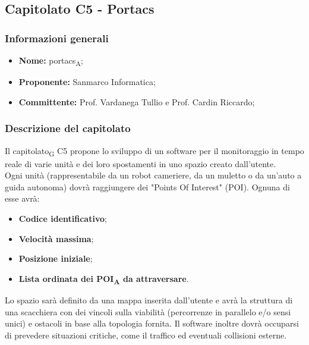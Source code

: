 \subsection{Capitolato C5 - Portacs}
\subsubsection{Informazioni generali}
	\begin{itemize}
	\item \textbf{Nome:} portacs\textsubscript{A};
	\item \textbf{Proponente:} Sanmarco Informatica;
	\item \textbf{Committente:}  Prof. Vardanega Tullio e Prof. Cardin Riccardo;
	\end{itemize}
\subsubsection{Descrizione del capitolato}
Il capitolato\textsubscript{G} C5 propone lo sviluppo di un software per il monitoraggio in tempo reale di varie unità e dei loro spostamenti in uno spazio creato dall'utente. \\
Ogni unità (rappresentabile da un robot cameriere, da un muletto o da un'auto a guida autonoma) dovrà raggiungere dei "Points Of Interest" (POI).
Ognuna di esse avrà: 
\begin{itemize}
	\item \textbf{Codice identificativo};
	\item \textbf{Velocità massima};
	\item \textbf{Posizione iniziale};
	\item \textbf{Lista ordinata dei POI\textsubscript{A} da attraversare}.
\end{itemize}
Lo spazio sarà definito da una mappa inserita dall'utente e avrà la struttura di una scacchiera con dei vincoli sulla viabilità (percorrenze in parallelo e/o sensi unici) e ostacoli in base alla topologia fornita.
Il software inoltre dovrà occuparsi di prevedere situazioni critiche, come il traffico ed eventuali collisioni esterne.

